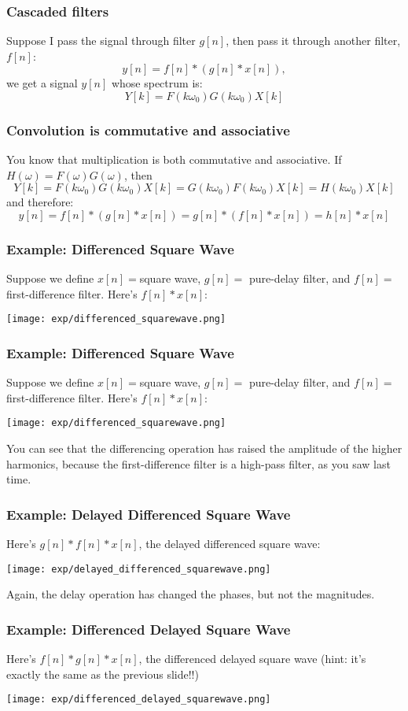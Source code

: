 \documentclass{beamer}
\begin{document}
\begin{frame}
  \frametitle{Cascaded filters}

  Suppose I pass the signal through filter $g[n]$, then pass it through
  another filter, $f[n]$:
  \[
  y[n]=f[n]\ast \left(g[n]\ast x[n]\right),
  \]
  we get a signal $y[n]$ whose spectrum is:
  \[
  Y[k]=F(k\omega_0) G(k\omega_0) X[k]
  \]
\end{frame}

\begin{frame}
  \frametitle{Convolution  is commutative and associative}

  You know that multiplication is both commutative and associative.
  If $H(\omega)=F(\omega)G(\omega)$, then
  \[
  Y[k] = F(k\omega_0) G(k\omega_0) X[k]=G(k\omega_0)F(k\omega_0) X[k]=H(k\omega_0)X[k]
  \]
  and therefore:
  \[
  y[n]=f[n]\ast \left(g[n]\ast x[n]\right)=g[n]\ast \left(f[n]\ast x[n]\right)
  =h[n]\ast x[n]
  \]
\end{frame}

\begin{frame}
  \frametitle{Example: Differenced Square Wave}

  Suppose we define $x[n]=$square wave, $g[n]=$ pure-delay filter, and
  $f[n]=$ first-difference filter.  Here's $f[n]\ast x[n]$:
  \centerline{\texttt{[image: exp/differenced\_squarewave.png]}}
\end{frame}
\begin{frame}
  \frametitle{Example: Differenced Square Wave}

  Suppose we define $x[n]=$square wave, $g[n]=$ pure-delay filter, and
  $f[n]=$ first-difference filter.  Here's $f[n]\ast x[n]$:
  \centerline{\texttt{[image: exp/differenced\_squarewave.png]}}
  You can see that the differencing operation has raised the amplitude
  of the higher harmonics, because the first-difference filter is a
  high-pass filter, as you saw last time.
\end{frame}

\begin{frame}
  \frametitle{Example: Delayed Differenced Square Wave}

  Here's $g[n]\ast f[n]\ast x[n]$, the delayed differenced square wave:
  \centerline{\texttt{[image: exp/delayed\_differenced\_squarewave.png]}}
  Again, the delay operation has changed the phases, but not the magnitudes.
\end{frame}

\begin{frame}
  \frametitle{Example: Differenced Delayed Square Wave}

  Here's $f[n]\ast g[n]\ast x[n]$, the differenced delayed square wave
  (hint: it's exactly the same as the previous slide!!)
  \centerline{\texttt{[image: exp/differenced\_delayed\_squarewave.png]}}
\end{frame}
\end{document}
